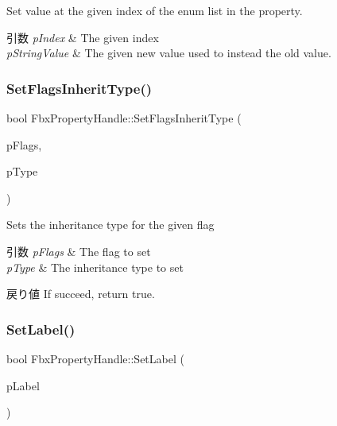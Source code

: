 Set value at the given index of the enum list in the property. 
\begin{DoxyParams}{引数}
{\em p\+Index} & The given index \\
\hline
{\em p\+String\+Value} & The given new value used to instead the old value. \\
\hline
\end{DoxyParams}
\mbox{\label{class_fbx_property_handle_af26f5ca742328a6894bd89ae80ef9c86}} 
\subsubsection{\texorpdfstring{Set\+Flags\+Inherit\+Type()}{SetFlagsInheritType()}}
{\footnotesize\ttfamily bool Fbx\+Property\+Handle\+::\+Set\+Flags\+Inherit\+Type (\begin{DoxyParamCaption}\item[{\hyperlink{class_fbx_property_flags_afabfa7e0949aac8a7dcdf8a141867e99}{Fbx\+Property\+Flags\+::\+E\+Flags}}]{p\+Flags,  }\item[{\hyperlink{class_fbx_property_flags_ae3b667a4fcac4b827fa186a698fec2f8}{Fbx\+Property\+Flags\+::\+E\+Inherit\+Type}}]{p\+Type }\end{DoxyParamCaption})}

Sets the inheritance type for the given flag 
\begin{DoxyParams}{引数}
{\em p\+Flags} & The flag to set \\
\hline
{\em p\+Type} & The inheritance type to set \\
\hline
\end{DoxyParams}
\begin{DoxyReturn}{戻り値}
If succeed, return true. 
\end{DoxyReturn}
\mbox{\label{class_fbx_property_handle_a501ee2ee91a27619728afeb7d69b5936}} 
\subsubsection{\texorpdfstring{Set\+Label()}{SetLabel()}}
{\footnotesize\ttfamily bool Fbx\+Property\+Handle\+::\+Set\+Label (\begin{DoxyParamCaption}\item[{const char $\ast$}]{p\+Label }\end{DoxyParamCaption})}

